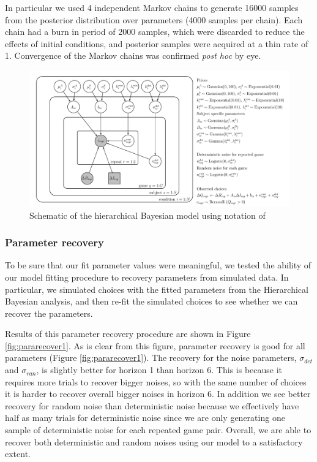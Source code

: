\documentclass[12pt]{article}
\begin{document}
	In particular we used 4 independent Markov chains to generate 16000 samples from the posterior distribution over parameters (4000 samples per chain).  Each chain had a burn in period of 2000 samples, which were discarded to reduce the effects of initial conditions, and posterior samples were acquired at a thin rate of 1.  Convergence of the Markov chains was confirmed {\it post hoc} by eye. 
	
	\begin{figure}[H]
		\begin{center}
			\includegraphics[width=1\textwidth]{figures/EEHorizon_2sigma.pdf}
    			\caption{Schematic of the hierarchical Bayesian model using notation of \cite{lee_wagenmakers_2014}}
			\label{fig:model}
		\end{center}
	\end{figure}
	
	\subsubsection*{Parameter recovery\label{ch:appendix:bayesrecovery}}
	
	To be sure that our fit parameter values were meaningful, we tested the ability of our model fitting procedure to recovery parameters from simulated data.  In particular, we simulated choices with the fitted parameters from the Hierarchical Bayesian analysis, and then re-fit the simulated choices to see whether we can recover the parameters. 
	
	Results of this parameter recovery procedure are shown in Figure \ref{fig:pararecover1}. As is clear from this figure, parameter recovery is good for all parameters  (Figure \ref{fig:pararecover1}).  The recovery for the noise parameters, $\sigma_{det}$ and $\sigma_{ran}$, is slightly better for horizon 1 than horizon 6. This is because it requires more trials to recover bigger noises, so with the same number of choices it is harder to recover overall bigger noises in horizon 6. In addition we see better recovery for random noise than deterministic noise because we effectively have half as many trials for deterministic noise since we are only generating one sample of deterministic noise for each repeated game pair. Overall, we are able to recover both deterministic and random noises using our model to a satisfactory extent.
	
\end{document}
